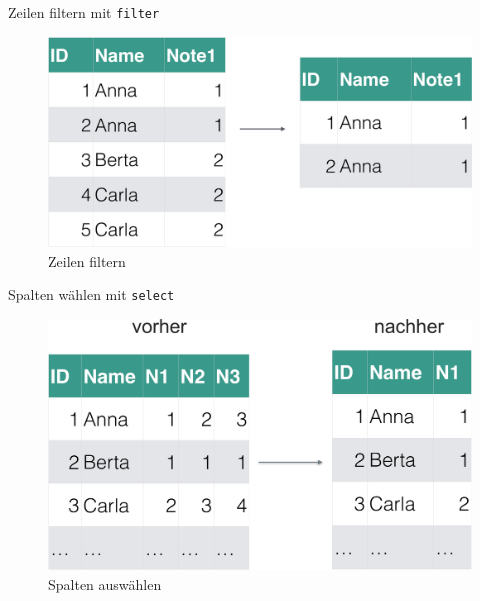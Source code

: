 \begin{frame}{Zeilen filtern mit \texttt{filter}}

\begin{figure}

{\centering \includegraphics[width=0.8\linewidth]{../images/Datenjudo/filter} 

}

\caption{Zeilen filtern}\label{fig:fig-filter}
\end{figure}

\end{frame}

\begin{frame}{Spalten wählen mit \texttt{select}}

\begin{figure}

{\centering \includegraphics[width=0.8\linewidth]{../images/Datenjudo/select} 

}

\caption{Spalten auswählen}\label{fig:fig-select}
\end{figure}

\end{frame}

